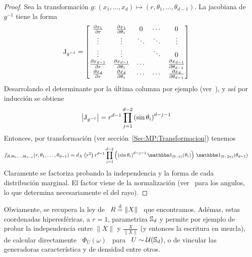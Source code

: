 \begin{proof}
  Sea      la       transformaci\'on      $g:      (x_1,\ldots,x_d)      \mapsto
  (r,\theta_1,\ldots,\theta_{d-1})$. La jacobiana de $g^{-1}$ tiene la forma
  \[
  \operatorname{J}_{g^{-1}} = \begin{bmatrix}
    \frac{\partial x_1}{\partial r} & \frac{\partial x_1}{\partial \theta_1} & 0 & \cdots & 0\\
    \vdots & \vdots & \ddots & \ddots & \vdots\\
    \vdots & \vdots &  & \ddots  & 0\\
    \frac{\partial x_{d-1}}{\partial r} & \frac{\partial x_{d-1}}{\partial
    \theta_1} & \cdots & & \frac{\partial x_{d-1}}{\partial \theta_{d-1}}\\
    \frac{\partial x_d}{\partial  r} & \frac{\partial  x_d}{\partial \theta_1} &
    \cdots & \cdots & \frac{\partial x_d}{\partial \theta_{d-1}}
  \end{bmatrix}
  \]
  Desarrolando   el   determinante  por   la   \'ultima   columna  por   ejemplo
  (ver~\cite{Bha97, HorJoh13}), y as\'i por inducci\'on se obtiene
  \[
  \left|   \operatorname{J}_{g^{-1}}  \right|  =   r^{d-1}  \prod_{j=1}^{d-2}   \left(  \sin
    \theta_i\right)^{d-j-1}
  \]
  Entonces,  por  transformaci\'on  (ver  secci\'on~\ref{Sec:MP:Transformacion})
  tenemos
  \[
  f_{R,\Theta_1,\ldots,\Theta_{d-1}}(r,\theta_1,\ldots,\theta_{d-1}) = d_X\left(
    r^2    \right)     r^{d-1}    \prod_{j=1}^{d-2}    \left(     \left(    \sin
      \theta_i\right)^{d-j-1} \un_{[0 \; \pi)}(\theta_i) \right) \, \un_{[0 \; 2
    \pi)}(\theta_{d-1})
  \]
  Claramente  se  factoriza  probando  la  independencia  y  la  forma  de  cada
  distribuci\'on   marginal.    El   factor   viene    de   la   normalizaci\'on
  (ver~\cite[Ec.~8.380-2]{GraRyz15}   para  los   angulos,   lo  que   determina
  necesariamente el del rayo).
\end{proof}
%
Obviamente,  se  recupera la  ley  de  \ $R  \stackrel{\mathrm{d}}{=}  \|X\|$  \ que  encontramos.
Ad\'emas, estas  coordenadas hiperesf\'ericas, a $r=1$,  parametriza $\mathbb{S}_d$ y
permite por ejemplo de probar la independencia entre $\|X\|$ y $\frac{X}{\|X\|}$
(y entonces la escritura en mezcla), de calcular directamente \ $\Phi_U(\omega)$
\ para \ $U \sim \mathcal{U}(\mathbb{S}_d)$,  o de vincular las generadoras caracter\'istica y
de densidad entre otros.


